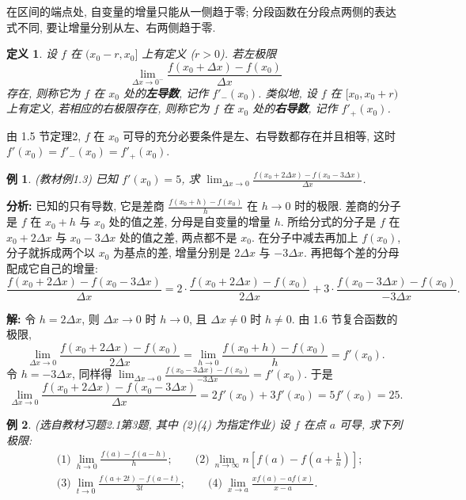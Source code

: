 \documentclass[UTF8,openany]{ctexbook}
\theoremstyle{chinesetextbook}
\newtheorem{definition}{定义}[section]
\newtheorem{example}{例}[section]
\newenvironment{cnsolution}{\par\indent\textbf{解:} \ignorespaces}{\par}
\begin{document}
在区间的端点处, 自变量的增量只能从一侧趋于零; 分段函数在分段点两侧的表达式不同, 要让增量分别从左、右两侧趋于零.
\begin{definition}
设 $f$ 在 $(x_0-r,x_0]$ 上有定义 ($r>0$). 若左极限
\[
\lim_{\Delta x\to0^-}\frac{f(x_0+\Delta x)-f(x_0)}{\Delta x}
\]
存在, 则称它为 $f$ 在 $x_0$ 处的\textbf{左导数}, 记作 $f'_-(x_0)$. 类似地, 设 $f$ 在 $[x_0,x_0+r)$ 上有定义, 若相应的右极限存在, 则称它为 $f$ 在 $x_0$ 处的\textbf{右导数}, 记作 $f'_+(x_0)$.
\end{definition}
由 1.5 节定理2, $f$ 在 $x_0$ 可导的充分必要条件是左、右导数都存在并且相等, 这时 $f'(x_0)=f'_-(x_0)=f'_+(x_0)$.
\begin{example}\label{ex:c2-1-3}
\textnormal{(教材例1.3)} 已知 $f'(x_0)=5$, 求 $\displaystyle\lim_{\Delta x\to0}\frac{f(x_0+2\Delta x)-f(x_0-3\Delta x)}{\Delta x}$.
\end{example}
\par\indent\textbf{分析:} 已知的只有导数, 它是差商 $\displaystyle\frac{f(x_0+h)-f(x_0)}h$ 在 $h\to0$ 时的极限. 差商的分子是 $f$ 在 $x_0+h$ 与 $x_0$ 处的值之差, 分母是自变量的增量 $h$. 所给分式的分子是 $f$ 在 $x_0+2\Delta x$ 与 $x_0-3\Delta x$ 处的值之差, 两点都不是 $x_0$. 在分子中减去再加上 $f(x_0)$, 分子就拆成两个以 $x_0$ 为基点的差, 增量分别是 $2\Delta x$ 与 $-3\Delta x$. 再把每个差的分母配成它自己的增量:
\[
\frac{f(x_0+2\Delta x)-f(x_0-3\Delta x)}{\Delta x}=2\cdot\frac{f(x_0+2\Delta x)-f(x_0)}{2\Delta x}+3\cdot\frac{f(x_0-3\Delta x)-f(x_0)}{-3\Delta x}.
\]
\begin{cnsolution}
令 $h=2\Delta x$, 则 $\Delta x\to0$ 时 $h\to0$, 且 $\Delta x\ne0$ 时 $h\ne0$. 由 1.6 节复合函数的极限,
\[
\lim_{\Delta x\to0}\frac{f(x_0+2\Delta x)-f(x_0)}{2\Delta x}=\lim_{h\to0}\frac{f(x_0+h)-f(x_0)}h=f'(x_0).
\]
令 $h=-3\Delta x$, 同样得 $\displaystyle\lim_{\Delta x\to0}\frac{f(x_0-3\Delta x)-f(x_0)}{-3\Delta x}=f'(x_0)$. 于是
\[
\lim_{\Delta x\to0}\frac{f(x_0+2\Delta x)-f(x_0-3\Delta x)}{\Delta x}=2f'(x_0)+3f'(x_0)=5f'(x_0)=25.
\]
\end{cnsolution}
\begin{example}\label{ex:c2-h1-3}
\textnormal{(选自教材习题2.1第3题, 其中 (2)(4) 为指定作业)} 设 $f$ 在点 $a$ 可导, 求下列极限:
\[
\begin{aligned}
&\text{(1)}\ \lim_{h\to0}\frac{f(a)-f(a-h)}h;\qquad\text{(2)}\ \lim_{n\to\infty}n\left[f(a)-f\left(a+\frac1n\right)\right];\\
&\text{(3)}\ \lim_{t\to0}\frac{f(a+2t)-f(a-t)}{3t};\qquad\text{(4)}\ \lim_{x\to a}\frac{xf(a)-af(x)}{x-a}.
\end{aligned}
\]
\end{example}
\end{document}

